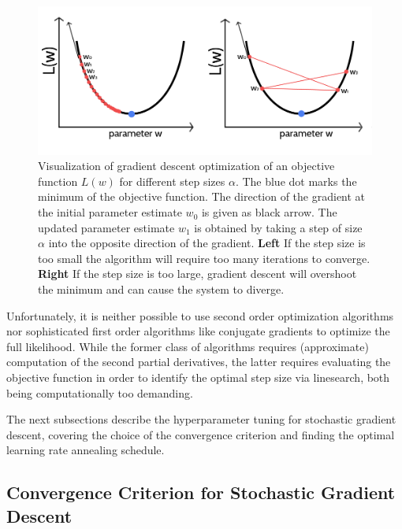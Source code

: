 \documentclass[11pt,a4paper,twoside]{book}
\theoremstyle{definition}
\theoremstyle{definition}
\theoremstyle{remark}
\begin{document}
\begin{figure}

{\centering \includegraphics[width=0.8\linewidth]{img/full_likelihood/intro} 

}

\caption{Visualization of gradient descent
optimization of an objective function \(L(w)\) for different step sizes
\(\alpha\). The blue dot marks the minimum of the objective function.
The direction of the gradient at the initial parameter estimate \(w_0\)
is given as black arrow. The updated parameter estimate \(w_1\) is
obtained by taking a step of size \(\alpha\) into the opposite direction
of the gradient. \textbf{Left} If the step size is too small the
algorithm will require too many iterations to converge. \textbf{Right}
If the step size is too large, gradient descent will overshoot the
minimum and can cause the system to diverge.}\label{fig:gd-learning-rate-intro}
\end{figure}

Unfortunately, it is neither possible to use second order optimization
algorithms nor sophisticated first order algorithms like conjugate
gradients to optimize the full likelihood. While the former class of
algorithms requires (approximate) computation of the second partial
derivatives, the latter requires evaluating the objective function in
order to identify the optimal step size via linesearch, both being
computationally too demanding.

The next subsections describe the hyperparameter tuning for stochastic
gradient descent, covering the choice of the convergence criterion and
finding the optimal learning rate annealing schedule.

\subsection{Convergence Criterion for Stochastic Gradient
Descent}\label{convergence-criteria-sgd}
\end{document}
